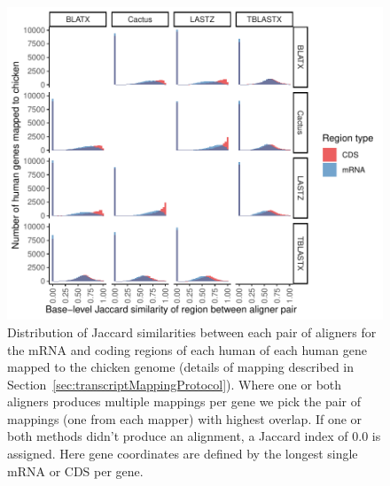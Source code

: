 \documentclass{article}
\newcommand{\secref}[1]{Section~\ref{#1}}
\begin{document}
\begin{figure}
\begin{center}
\includegraphics[width=\textwidth]{gene_cds_human_to_chicken_pairwise_jaccard_distributions.pdf}
\caption{Distribution of Jaccard similarities between each pair of aligners for the mRNA and coding regions of each human of each human gene mapped to the chicken genome (details of mapping described in \secref{sec:transcriptMappingProtocol}). Where one or both aligners produces multiple mappings per gene we pick the pair of mappings (one from each mapper) with highest overlap. If one or both methods didn't produce an
alignment, a Jaccard index of 0.0 is assigned. Here gene coordinates are defined by the longest single mRNA or CDS per gene.\label{fig:geneCDSJaccards}}
\end{center}
\end{figure}
\end{document}
